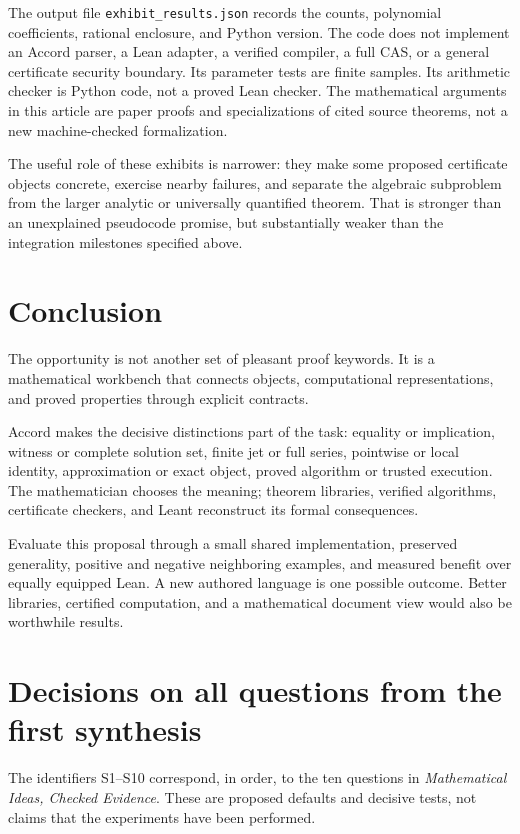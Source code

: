\documentclass[11pt,letterpaper]{article}
\newcommand{\code}[1]{\nolinkurl{#1}}
\theoremstyle{definition}
\begin{document}
The output file \code{exhibit_results.json} records the counts, polynomial
coefficients, rational enclosure, and Python version. The code does not implement
an Accord parser, a Lean adapter, a verified compiler, a full CAS, or a general
certificate security boundary. Its parameter tests are finite samples. Its
arithmetic checker is Python code, not a proved Lean checker. The mathematical
arguments in this article are paper proofs and specializations of cited
source theorems, not a new machine-checked formalization.

The useful role of these exhibits is narrower: they make some proposed certificate
objects concrete, exercise nearby failures, and separate the algebraic subproblem
from the larger analytic or universally quantified theorem. That is stronger than
an unexplained pseudocode promise, but substantially weaker than the integration
milestones specified above.

\section{Conclusion}
The opportunity is not another set of pleasant proof keywords. It is a mathematical
workbench that connects objects, computational representations, and proved
properties through explicit contracts.

Accord makes the decisive distinctions part of the task: equality or implication,
witness or complete solution set, finite jet or full series, pointwise or local
identity, approximation or exact object, proved algorithm or trusted execution.
The mathematician chooses the meaning; theorem libraries, verified algorithms,
certificate checkers, and Leant reconstruct its formal consequences.

Evaluate this proposal through a small shared implementation, preserved generality,
positive and negative neighboring examples, and measured benefit over equally
equipped Lean. A new authored language is one possible outcome. Better libraries,
certified computation, and a mathematical document view would also be worthwhile
results.

\clearpage
\appendix
\section{Decisions on all questions from the first synthesis}\label{app:questionsS}
The identifiers S1--S10 correspond, in order, to the ten questions in
\emph{Mathematical Ideas, Checked Evidence}\cite{synthesis}. These are proposed
defaults and decisive tests, not claims that the experiments have been performed.
\end{document}
